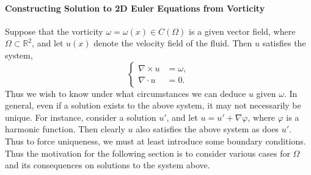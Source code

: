 \documentclass{article}
\begin{document}
\paragraph{Constructing Solution to 2D Euler Equations from Vorticity} Suppose that the vorticity $\omega = \omega(x) \in C(\Omega)$ is a given vector field, where $\Omega \subset \mathbb{R}^{2}$, and let $u(x)$ denote the velocity field of the fluid. Then $u$ satisfies the system, 
\begin{equation*}
	\left\{
	\begin{alignedat}{1}
		\nabla \times u &= \omega, \\
		\nabla \cdot u&= 0. 
	\end{alignedat} 
	\right. 
\end{equation*} 
Thus we wish to know under what circumstances we can deduce $u$ given $\omega$. In general, even if a solution exists to the above system, it may not necessarily be unique. For instance, consider a solution $u'$, and let $u = u' + \nabla \varphi$, where $\varphi$ is a harmonic function. Then clearly $u$ also satisfies the above system as does $u'$. Thus to force uniqueness, we must at least introduce some boundary conditions. Thus the motivation for the following section is to consider various cases for $\Omega$ and its consequences on solutions to the system above. 
\end{document}
